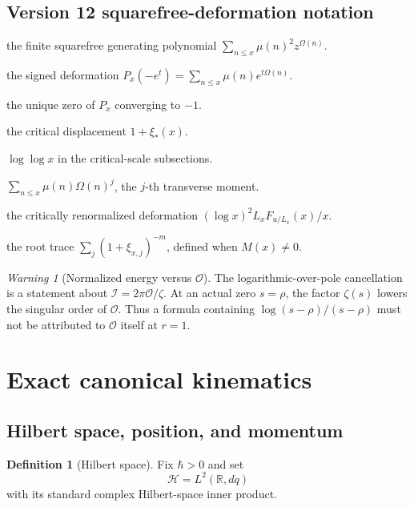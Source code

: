 \documentclass[11pt]{amsart}
\numberwithin{equation}{section}
\theoremstyle{plain}
\theoremstyle{definition}
\newtheorem{definition}[theorem]{Definition}
\theoremstyle{remark}
\newtheorem{warning}[theorem]{Warning}
\newcommand{\R}{\mathbb{R}}
\newcommand{\Hil}{\mathcal{H}}
\begin{document}
\subsection{Version 12 squarefree-deformation notation}
\label{subsec:notation_v11}

\begin{description}[leftmargin=3.2cm,style=nextline]
\item[\(P_x(z)\)] the finite squarefree generating polynomial
\(\sum_{n\le x}\mu(n)^2z^{\Omega(n)}\).
\item[\(F_t(x)\)] the signed deformation
\(P_x(-e^t)=\sum_{n\le x}\mu(n)e^{t\Omega(n)}\).
\item[\(\xi_*(x)\)] the unique zero of \(P_x\) converging to \(-1\).
\item[\(h_x\)] the critical displacement \(1+\xi_*(x)\).
\item[\(L_x\)] \(\log\log x\) in the critical-scale subsections.
\item[\(M_j(x)\)] \(\sum_{n\le x}\mu(n)\Omega(n)^j\), the \(j\)-th
transverse moment.
\item[\(\Phi_x(u)\)] the critically renormalized deformation
\((\log x)^2L_xF_{u/L_x}(x)/x\).
\item[\(T_m(x)\)] the root trace
\(\sum_j(1+\xi_{x,j})^{-m}\), defined when \(M(x)\ne0\).
\end{description}

\begin{warning}[Normalized energy versus \(\mathcal O\)]
\label{warn:I_vs_O_notation}
The logarithmic-over-pole cancellation is a statement about
\(\mathcal I=2\pi\mathcal O/\zeta\).  At an actual zero \(s=\rho\), the
factor \(\zeta(s)\) lowers the singular order of \(\mathcal O\).  Thus a
formula containing \(\log(s-\rho)/(s-\rho)\) must not be attributed to
\(\mathcal O\) itself at \(r=1\).
\end{warning}

\section{Exact canonical kinematics}
\label{sec:kinematics}

\subsection{Hilbert space, position, and momentum}
\label{subsec:QP_definitions}

\begin{definition}[Hilbert space]
\label{def:hilbert_space}
Fix $\hbar>0$ and set
\begin{equation}
\Hil=L^2(\R,dq)
\label{eq:hilbert_space}
\end{equation}
with its standard complex Hilbert-space inner product.
\end{definition}
\end{document}
